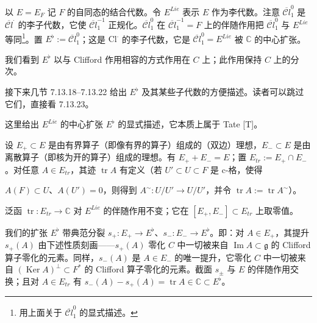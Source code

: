 以 $E=E_F$ 记 $F$ 的自同态的结合代数。令 $E^{Lie}$ 表示 $E$ 作为李代数。注意 $\overline{\mathcal{C}l}^{0}_1$ 是 $\overline{\mathcal{C}l}^{\cdot}$ 的李子代数，它使 $\overline{\mathcal{C}l}^{-1}_1$ 正规化。$\overline{\mathcal{C}l}^{0}_1$ 在 $\overline{\mathcal{C}l}^{-1}_1=F$ 上的伴随作用把 $\overline{\mathcal{C}l}^{0}_1$ 与 $E^{Lie}$ 等同\footnote{用上面关于 $\overline{\mathcal{C}l}^{0}_1$ 的显式描述。}。置 $E^{\flat}:=\overline{\mathcal{C}l}^{0}_1$；这是 $\mathrm{Cl}^{\cdot}$ 的李子代数，它是 $\overline{\mathcal{C}l}^{0}_1=E^{Lie}$ 被 $\mathbb{C}$ 的中心扩张。

我们看到 $E^{\flat}$ 以与 Clifford 作用相容的方式作用在 $C$ 上；此作用保持 $C$ 上的分次。

接下来几节 7.13.18--7.13.22 给出 $E^{\flat}$ 及其某些子代数的方便描述。读者可以跳过它们，直接看 7.13.23。

 这里给出 $E^{Lie}$ 的中心扩张 $E^{\flat}$ 的显式描述，它本质上属于 Tate [T]。

设 $E_+\subset E$ 是由有界算子（即像有界的算子）组成的（双边）理想，$E_-\subset E$ 是由离散算子（即核为开的算子）组成的理想。有 $E_++E_-=E$；置 $E_{tr}:=E_+\cap E_-$。对任意 $A\in E_{tr}$，其迹 $\operatorname{tr}A$ 有定义（若 $U'\subset U\subset F$ 是 c-格，使得


$A(F)\subset U$、$A(U')=0$，则得到 $A^{\sim}:U/U'\to U/U'$，并令 $\operatorname{tr}A:=\operatorname{tr}A^{\sim}$）。

泛函 $\operatorname{tr}:E_{tr}\to\mathbb{C}$ 对 $E^{Lie}$ 的伴随作用不变；它在 $[E_+,E_-]\subset E_{tr}$ 上取零值。

我们的扩张 $E^{\flat}$ 带典范分裂 $s_+:E_+\to E^{\flat}$、$s_-:E_-\to E^{\flat}$。即：对 $A\in E_+$，其提升 $s_+(A)$ 由下述性质刻画——$s_+(A)$ 零化 $C$ 中一切被来自 $\operatorname{Im}A\subset\mathfrak{g}$ 的 Clifford 算子零化的元素。同样，$s_-(A)$ 是 $A\in E_-$ 的唯一提升，它零化 $C$ 中一切被来自 $(\operatorname{Ker}A)^{\perp}\subset F^{*}$ 的 Clifford 算子零化的元素。截面 $s_{\pm}$ 与 $E$ 的伴随作用交换；且对 $A\in E_{tr}$ 有 $s_-(A)-s_+(A)=\operatorname{tr}A\in\mathbb{C}\subset E^{\flat}$。

